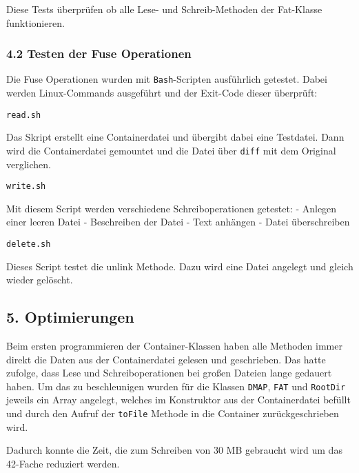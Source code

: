 \documentclass[]{article}
\newenvironment{Shaded}{}{}
\newcommand{\BuiltInTok}[1]{#1}
\newcommand{\KeywordTok}[1]{\textcolor[rgb]{0.00,0.44,0.13}{\textbf{#1}}}
\newcommand{\NormalTok}[1]{#1}
\newcommand{\OperatorTok}[1]{\textcolor[rgb]{0.40,0.40,0.40}{#1}}
\newcommand{\OtherTok}[1]{\textcolor[rgb]{0.00,0.44,0.13}{#1}}
\newcommand{\StringTok}[1]{\textcolor[rgb]{0.25,0.44,0.63}{#1}}
\newcommand{\VariableTok}[1]{\textcolor[rgb]{0.10,0.09,0.49}{#1}}
\begin{document}
Diese Tests überprüfen ob alle Lese- und Schreib-Methoden der Fat-Klasse
funktionieren.

\hypertarget{testen-der-fuse-operationen}{%
\subsubsection{4.2 Testen der Fuse
Operationen}\label{testen-der-fuse-operationen}}

Die Fuse Operationen wurden mit \texttt{Bash}-Scripten ausführlich
getestet. Dabei werden Linux-Commands ausgeführt und der Exit-Code
dieser überprüft:

\begin{Shaded}
\begin{framed}
\end{framed}
\end{Shaded}

\texttt{read.sh}

Das Skript erstellt eine Containerdatei und übergibt dabei eine
Testdatei. Dann wird die Containerdatei gemountet und die Datei über
\texttt{diff} mit dem Original verglichen.

\texttt{write.sh}

Mit diesem Script werden verschiedene Schreiboperationen getestet: -
Anlegen einer leeren Datei - Beschreiben der Datei - Text anhängen -
Datei überschreiben

\texttt{delete.sh}

Dieses Script testet die unlink Methode. Dazu wird eine Datei angelegt
und gleich wieder gelöscht.

\hypertarget{optimierungen}{%
\subsection{5. Optimierungen}\label{optimierungen}}

Beim ersten programmieren der Container-Klassen haben alle Methoden
immer direkt die Daten aus der Containerdatei gelesen und geschrieben.
Das hatte zufolge, dass Lese und Schreiboperationen bei großen Dateien
lange gedauert haben. Um das zu beschleunigen wurden für die Klassen
\texttt{DMAP}, \texttt{FAT} und \texttt{RootDir} jeweils ein Array
angelegt, welches im Konstruktor aus der Containerdatei befüllt und
durch den Aufruf der \texttt{toFile} Methode in die Container
zurückgeschrieben wird.

Dadurch konnte die Zeit, die zum Schreiben von 30 MB gebraucht wird um
das 42-Fache reduziert werden.
\end{document}
